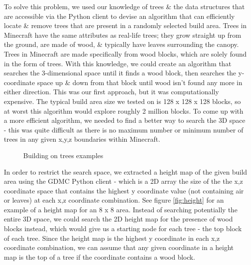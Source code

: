 \documentclass[11pt, oneside]{article}
\begin{document}
\begin{normalsize}
To solve this problem, we used our knowledge of trees \& the data structures that are accessible via the Python client to devise an algorithm that can efficiently locate \& remove trees that are present in a randomly selected build area. Trees in Minecraft have the same attributes as real-life trees; they grow straight up from the ground, are made of wood, \& typically have leaves surrounding the canopy. Trees in Minecraft are made specifically from wood blocks, which are solely found in the form of trees. With this knowledge, we could create an algorithm that searches the 3-dimensional space until it finds a wood block, then searches the y-coordinate space up \& down from that block until wood isn't found any more in either direction. This was our first approach, but it was computationally expensive. The typical build area size we tested on is 128 x 128 x 128 blocks, so at worst this algorithm would explore roughly 2 million blocks. To come up with a more efficient algorithm, we needed to find a better way to search the 3D space -  this was quite difficult as there is no maximum number or minimum number of trees in any given x,y,z boundaries within Minecraft. 

\begin{figure}[H]%
    \centering
    \qquad
    \caption{Building on trees examples}%
    \label{fig:tree}%
\end{figure}

In order to restrict the search space, we extracted a height map of the given build area using the GDMC Python client - which is a 2D array the size of the the x,z coordinate space that contains the highest y coordinate value (not containing air or leaves) at each x,z coordinate combination. See figure \ref{fig:height} for an example of a height map for an 8 x 8 area. Instead of searching potentially the entire 3D space, we could search the 2D height map for the presence of wood blocks instead, which would give us a starting node for each tree - the top block of each tree. Since the height map is the highest y coordinate in each x,z coordinate combination, we can assume that any given coordinate in a height map is the top of a tree if the coordinate contains a wood block.


\end{normalsize}
\end{document}
